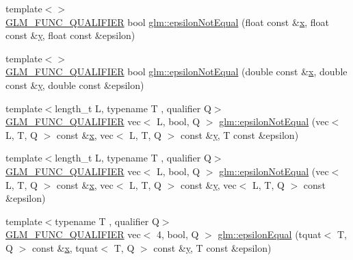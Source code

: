 \begin{DoxyCompactItemize}
{\footnotesize template$<$$>$ }\\\mbox{\hyperlink{setup_8hpp_a33fdea6f91c5f834105f7415e2a64407}{G\+L\+M\+\_\+\+F\+U\+N\+C\+\_\+\+Q\+U\+A\+L\+I\+F\+I\+ER}} bool \mbox{\hyperlink{namespaceglm_af4127d65f4afc6e447d461bae25f90fe}{glm\+::epsilon\+Not\+Equal}} (float const \&\mbox{\hyperlink{_s_d_l__opengl_8h_ad0e63d0edcdbd3d79554076bf309fd47}{x}}, float const \&\mbox{\hyperlink{_s_d_l__opengl_8h_a1675d9d7bb68e1657ff028643b4037e3}{y}}, float const \&epsilon)
\item 
{\footnotesize template$<$$>$ }\\\mbox{\hyperlink{setup_8hpp_a33fdea6f91c5f834105f7415e2a64407}{G\+L\+M\+\_\+\+F\+U\+N\+C\+\_\+\+Q\+U\+A\+L\+I\+F\+I\+ER}} bool \mbox{\hyperlink{namespaceglm_a68d8ce38812c8599018e404afc79f088}{glm\+::epsilon\+Not\+Equal}} (double const \&\mbox{\hyperlink{_s_d_l__opengl_8h_ad0e63d0edcdbd3d79554076bf309fd47}{x}}, double const \&\mbox{\hyperlink{_s_d_l__opengl_8h_a1675d9d7bb68e1657ff028643b4037e3}{y}}, double const \&epsilon)
\item 
{\footnotesize template$<$length\+\_\+t L, typename T , qualifier Q$>$ }\\\mbox{\hyperlink{setup_8hpp_a33fdea6f91c5f834105f7415e2a64407}{G\+L\+M\+\_\+\+F\+U\+N\+C\+\_\+\+Q\+U\+A\+L\+I\+F\+I\+ER}} vec$<$ L, bool, Q $>$ \mbox{\hyperlink{group__gtc__epsilon_gaf840d33b9a5261ec78dcd5125743b025}{glm\+::epsilon\+Not\+Equal}} (vec$<$ L, T, Q $>$ const \&\mbox{\hyperlink{_s_d_l__opengl_8h_ad0e63d0edcdbd3d79554076bf309fd47}{x}}, vec$<$ L, T, Q $>$ const \&\mbox{\hyperlink{_s_d_l__opengl_8h_a1675d9d7bb68e1657ff028643b4037e3}{y}}, T const \&epsilon)
\item 
{\footnotesize template$<$length\+\_\+t L, typename T , qualifier Q$>$ }\\\mbox{\hyperlink{setup_8hpp_a33fdea6f91c5f834105f7415e2a64407}{G\+L\+M\+\_\+\+F\+U\+N\+C\+\_\+\+Q\+U\+A\+L\+I\+F\+I\+ER}} vec$<$ L, bool, Q $>$ \mbox{\hyperlink{namespaceglm_a74221cd9d4ae4bf14a94b9fd781e4d78}{glm\+::epsilon\+Not\+Equal}} (vec$<$ L, T, Q $>$ const \&\mbox{\hyperlink{_s_d_l__opengl_8h_ad0e63d0edcdbd3d79554076bf309fd47}{x}}, vec$<$ L, T, Q $>$ const \&\mbox{\hyperlink{_s_d_l__opengl_8h_a1675d9d7bb68e1657ff028643b4037e3}{y}}, vec$<$ L, T, Q $>$ const \&epsilon)
\item 
{\footnotesize template$<$typename T , qualifier Q$>$ }\\\mbox{\hyperlink{setup_8hpp_a33fdea6f91c5f834105f7415e2a64407}{G\+L\+M\+\_\+\+F\+U\+N\+C\+\_\+\+Q\+U\+A\+L\+I\+F\+I\+ER}} vec$<$ 4, bool, Q $>$ \mbox{\hyperlink{namespaceglm_aace7d888eddc231974f670d0f5c11873}{glm\+::epsilon\+Equal}} (tquat$<$ T, Q $>$ const \&\mbox{\hyperlink{_s_d_l__opengl_8h_ad0e63d0edcdbd3d79554076bf309fd47}{x}}, tquat$<$ T, Q $>$ const \&\mbox{\hyperlink{_s_d_l__opengl_8h_a1675d9d7bb68e1657ff028643b4037e3}{y}}, T const \&epsilon)

\end{DoxyCompactItemize}
